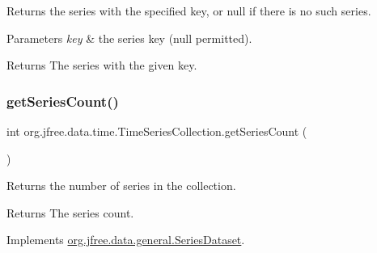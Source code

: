 Returns the series with the specified key, or {\ttfamily null} if there is no such series.


\begin{DoxyParams}{Parameters}
{\em key} & the series key ({\ttfamily null} permitted).\\
\hline
\end{DoxyParams}
\begin{DoxyReturn}{Returns}
The series with the given key. 
\end{DoxyReturn}
\mbox{\label{classorg_1_1jfree_1_1data_1_1time_1_1_time_series_collection_af269ae563f10353b2dc71baffdcff231}} 
\subsubsection{\texorpdfstring{get\+Series\+Count()}{getSeriesCount()}}
{\footnotesize\ttfamily int org.\+jfree.\+data.\+time.\+Time\+Series\+Collection.\+get\+Series\+Count (\begin{DoxyParamCaption}{ }\end{DoxyParamCaption})}

Returns the number of series in the collection.

\begin{DoxyReturn}{Returns}
The series count. 
\end{DoxyReturn}


Implements \mbox{\hyperlink{interfaceorg_1_1jfree_1_1data_1_1general_1_1_series_dataset_a84fe822f5918f941d9de1ed1b73c9f58}{org.\+jfree.\+data.\+general.\+Series\+Dataset}}.

\mbox{\label{classorg_1_1jfree_1_1data_1_1time_1_1_time_series_collection_a7877e0f810408744ff29053bcbf3fa16}} 
